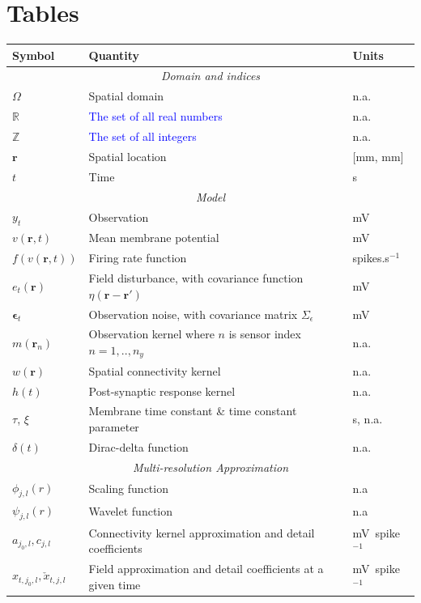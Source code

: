 \documentclass[review,authoryear,3p]{elsarticle}
\newcommand{\parham}[1]{\textcolor{blue}{#1}}
\begin{document}
\section*{Tables}
 \singlespacing
\begin{table}[!t]
\begin{tabular}{|l|l|l|}
	\hline
	\textbf{Symbol} & \textbf{Quantity} & \textbf{Units}\\
	\hline
	\multicolumn{3}{|c|}{\emph{Domain and indices}}\\
	\hline
	$\Omega$ & Spatial domain & n.a.\\ 
	$\mathbb{R}$&\parham{The set of all real numbers}&n.a.\\
	$\mathbb{Z}$&\parham{The set of all integers}&n.a.\\
	$\mathbf{r}$ & Spatial location & [mm, mm]\\
	$t$ & Time & s\\
	\hline
	\multicolumn{3}{|c|}{\emph{Model}}\\
	\hline
    $y_t$ & Observation & mV\\
    $v(\mathbf{r},t)$ & Mean membrane potential & mV \\
	$f(v\left(\mathbf{r},t\right))$ & Firing rate function & spikes.s$^{-1}$\\
	$e_t(\mathbf{r})$ & Field disturbance, with covariance function $\eta(\mathbf r-\mathbf r')$ & mV\\
	$\boldsymbol\epsilon_t$ & Observation noise, with covariance matrix $\Sigma_\epsilon$ & mV\\
	$m(\mathbf{r}_n)$ & Observation kernel where $n$ is sensor index $n=1,..,n_y$ & n.a. \\
	$w(\mathbf{r})$ & Spatial connectivity kernel & n.a.\\
	$h(t)$ & Post-synaptic response kernel & n.a.\\
	$\tau$, $\xi$ & Membrane time constant \& time constant parameter & s, n.a.\\
	$\delta(t)$ & Dirac-delta function & n.a.\\
	\hline    
	\multicolumn{3}{|c|}{\emph{Multi-resolution Approximation}} \\
	\hline                                                   
	$\phi_{j,l}(r)$&Scaling function&n.a\\
	$\psi_{j,l}(r)$&Wavelet function&n.a\\  
	$a_{j_0,l}, c_{j,l}$&Connectivity kernel approximation and detail coefficients&mV~spike$^{-1}$\\ 
	$x_{t,j_{0},l},\check{x}_{t,j,l}$&Field approximation and detail coefficients at a given time&mV~spike$^{-1}$\\ 

\end{tabular}
\end{table}
\end{document}
